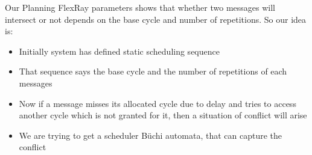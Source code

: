 \documentclass[runningheads,a4paper]{llncs}
\begin{document}
 
 Our Planning 
FlexRay parameters shows that whether two messages will intersect or not
depends on the base cycle and number of repetitions. So our idea is:
\begin{itemize}
\item Initially system has defined static scheduling sequence
\item That sequence says the base cycle and the number of repetitions of each messages
\item Now if a message misses its allocated cycle due to delay and tries to access another cycle which is 
      not granted for it, then a situation of conflict will arise
\item We are trying to get a scheduler B\"{u}chi automata, that can capture the conflict
       
\end{itemize}
\end{document}
